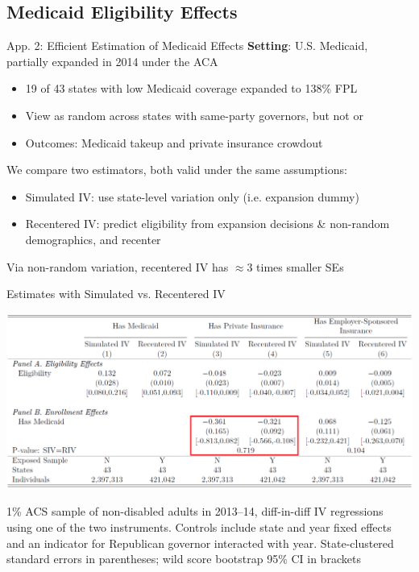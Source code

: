 \documentclass{beamer}
\begin{document}
\subsection{Medicaid Eligibility Effects}
\begin{frame}[label=ACA]{App. 2: Efficient Estimation of Medicaid Effects}
\vspace{-0.1cm}
\textbf{Setting}: U.S. Medicaid, partially expanded in 2014 under the ACA
\vspace{0.1cm}
	\begin{itemize}
	\item 19 of 43 states with low Medicaid coverage expanded to 138\% FPL
	\vspace{0.1cm}
	\item View  as random across states with same-party governors, but not  or 
	\vspace{0.1cm}
	\item Outcomes: Medicaid takeup and private insurance crowdout
\end{itemize}

\vspace{0.2cm}\pause
We compare two estimators, both valid under the same assumptions:
\begin{itemize}
	\vspace{0.1cm}
	\item Simulated IV: use state-level variation only (i.e. expansion dummy)
	\vspace{0.1cm}
	\item Recentered IV: predict eligibility from expansion decisions \& non-random demographics, and recenter
	\end{itemize}\pause{}
\vspace{0.2cm}
Via non-random variation, recentered IV has $\approx 3$ times smaller SEs
\end{frame}

\begin{frame}{Estimates with Simulated vs. Recentered IV}
	\begin{center}
	\includegraphics[width=1\textwidth]{lecture_includes/aca_ss.png}
	\end{center}

\footnotesize{1\% ACS sample of non-disabled adults in 2013--14, diff-in-diff IV regressions using one of the two instruments. Controls include state and year fixed effects and an indicator for Republican governor interacted with year. State-clustered standard errors in parentheses; wild score bootstrap 95\% CI in brackets} 
\end{frame}
\end{document}
